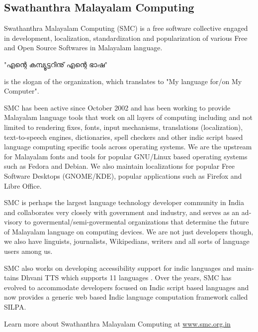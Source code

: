 \begin{english}
\section*{Swathanthra Malayalam Computing}

Swathanthra Malayalam Computing (SMC) is a free software collective engaged in development, localization, standardization and popularization of various Free and Open Source Softwares in Malayalam language.\end{english} "എന്റെ കമ്പ്യൂട്ടറിനു് എന്റെ ഭാഷ" \begin{english} is the slogan of the organization, which translates to "My language for/on My Computer".

SMC has been active since October 2002 and has been working to provide Malayalam language tools that work on all layers of computing including and not limited to rendering fixes, fonts, input mechanisms, translations (localization), text-to-speech engines, dictionaries, spell checkers and other indic script based language computing specific tools across operating systems. We are the upstream for Malayalam fonts and tools for popular GNU/Linux based operating systems such as Fedora and Debian. We also maintain localizations for popular Free Software Desktops (GNOME/KDE), popular applications such as Firefox and Libre Office.

SMC is perhaps the largest language technology developer community in India and collaborates very closely with government and industry, and serves as an advisory to govermental/semi-govermental organizations that determine the future of Malayalam language on computing devices. We are not just developers though, we also have linguists, journalists, Wikipedians, writers and all sorts of language users among us.

SMC also works on developing accessibility support for indic languages and maintains Dhvani TTS which supports 11 languages . Over the years, SMC has evolved to accommodate developers focused on Indic script based languages and now provides a generic web based Indic language computation framework called SILPA.

Learn more about Swathanthra Malayalam Computing at \url{www.smc.org.in}
\end{english}
